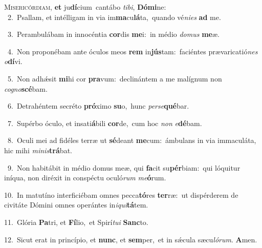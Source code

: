 \lettrine{\initial\textcolor{\initialcolor}{M}}{isericórdiam,} \textbf{et} ju\-\textbf{dí}\-cium~\star cantábo \textit{ti}\-\textit{bi}, \textbf{Dó}\-\textbf{mi}ne:\\
{\numbfont\textcolor{\numbcolor}{~2.}}~Psallam, et intélligam in via im\-\textbf{ma}\-cu\-\textbf{lá}\-ta,~\star quando vé\-\textit{ni}\-\textit{es} \textbf{ad} me.\par
{\numbfont\textcolor{\numbcolor}{~3.}}~Perambulábam in innocéntia \textbf{cor}\-dis \textbf{me}\-i:~\star in médio \textit{do}\-\textit{mus} \textbf{me}\-æ.\par
{\numbfont\textcolor{\numbcolor}{~4.}}~Non proponébam ante óculos meos \textbf{rem} in\-\textbf{jús}\-tam:~\star faciéntes prævaricatió\textit{nes} \textit{o}\-\textbf{dí}vi.\par
{\numbfont\textcolor{\numbcolor}{~5.}}~Non adhǽsit \textbf{mi}\-hi cor \textbf{pra}\-vum:~\star declinántem a me malígnum non \textit{co}\-\textit{gno}\textbf{scé}bam.\par
{\numbfont\textcolor{\numbcolor}{~6.}}~Detrahéntem secréto \textbf{pró}\-ximo \textbf{su}\-o,~\star hunc \textit{per}\-\textit{se}\textbf{qué}bar.\par
{\numbfont\textcolor{\numbcolor}{~7.}}~Supérbo óculo, et insati\-\textbf{á}\-bili \textbf{cor}\-de,~\star cum hoc \textit{non} \textit{e}\-\textbf{dé}bam.\par
{\numbfont\textcolor{\numbcolor}{~8.}}~Oculi mei ad fidéles terræ ut \textbf{sé}\-deant \textbf{me}\-cum:~\star ámbulans in via immaculáta, hic mihi \textit{mi}\-\textit{nis}\textbf{trá}bat.\par
{\numbfont\textcolor{\numbcolor}{~9.}}~Non habitábit in médio domus meæ, qui \textbf{fa}\-cit su\-\textbf{pér}\-biam:~\star qui lóquitur iníqua, non diréxit in conspéctu oculó\textit{rum} \textit{me}\-\textbf{ó}rum.\par
{\numbfont\textcolor{\numbcolor}{10.}}~In matutíno interficiébam omnes pecca\-\textbf{tó}\-res \textbf{ter}\-ræ:~\star ut dispérderem de civitáte Dómini omnes operántes in\-\textit{i}\-\textit{qui}\textbf{tá}tem.\par
{\numbfont\textcolor{\numbcolor}{11.}}~Glória \textbf{Pa}\-tri, et \textbf{Fí}\-lio,~\star et Spirí\-\textit{tu}\-\textit{i} \textbf{Sanc}\-to.\par
{\numbfont\textcolor{\numbcolor}{12.}}~Sicut erat in princípio, et \textbf{nunc}\-, et \textbf{sem}\-per,~\star et in sǽcula sæcu\-\textit{ló}\-\textit{rum}. \textbf{A}\-men.\par
